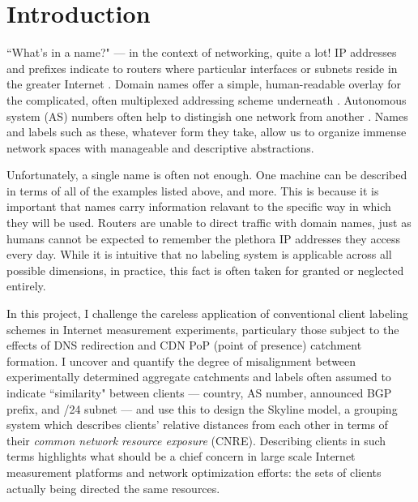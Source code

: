 \section{Introduction} \label{sect:intro}

``What's in a name?" --- in the context of networking, quite a lot! IP addresses and prefixes
indicate to routers where particular interfaces or subnets reside in the greater Internet
\cite{bgp}. Domain
names offer a simple, human-readable overlay for the complicated, often multiplexed addressing
scheme underneath \cite{dns}. Autonomous system (AS) numbers often help to distingish one network
from another \cite{asn}.
Names and labels such as these, whatever form they take, allow us to organize immense network spaces
with manageable and descriptive abstractions.

Unfortunately, a single name is often not enough. One machine can be described in terms of all of
the examples listed above, and more. This is because it is important that names carry information
relavant to the specific way in which they will be used. Routers are unable to direct traffic with
domain names, just as humans cannot be expected to remember the plethora IP addresses they access
every day. While it is intuitive that no labeling system is applicable across all possible
dimensions, in practice, this fact is often taken for granted or neglected entirely.

In this project, I challenge the careless application of conventional client labeling schemes in
Internet measurement experiments, particulary those subject to the effects of DNS redirection and
CDN PoP (point of presence) catchment formation. I uncover and quantify the degree of misalignment
between experimentally determined aggregate catchments and labels often assumed to indicate
``similarity" between clients --- country, AS number, announced BGP prefix, and /24 subnet --- and
use this to design the Skyline model, a grouping system which describes clients' relative distances
from each other in terms of their \emph{common network resource exposure} (CNRE). Describing clients in such
terms highlights what should be a chief concern in large scale Internet measurement platforms and
network optimization efforts: the sets of clients actually being directed the same resources.

